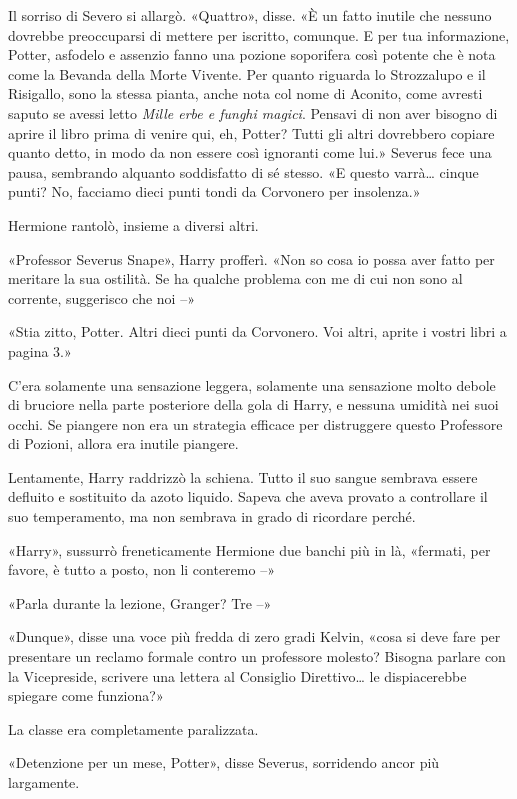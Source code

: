 Il sorriso di Severo si allargò. «Quattro», disse. «È un fatto inutile che nessuno dovrebbe preoccuparsi di mettere per iscritto, comunque. E per tua informazione, Potter, asfodelo e assenzio fanno una pozione soporifera così potente che è nota come la Bevanda della Morte Vivente. Per quanto riguarda lo Strozzalupo e il Risigallo, sono la stessa pianta, anche nota col nome di Aconito, come avresti saputo se avessi letto \textit{Mille erbe e funghi magici}. Pensavi di non aver bisogno di aprire il libro prima di venire qui, eh, Potter? Tutti gli altri dovrebbero copiare quanto detto, in modo da non essere così ignoranti come lui.» Severus fece una pausa, sembrando alquanto soddisfatto di sé stesso. «E questo varrà… cinque punti? No, facciamo dieci punti tondi da Corvonero per insolenza.»

Hermione rantolò, insieme a diversi altri.

«Professor Severus Snape», Harry profferì. «Non so cosa io possa aver fatto per meritare la sua ostilità. Se ha qualche problema con me di cui non sono al corrente, suggerisco che noi –»

«Stia zitto, Potter. Altri dieci punti da Corvonero. Voi altri, aprite i vostri libri a pagina 3.»

C’era solamente una sensazione leggera, solamente una sensazione molto debole di bruciore nella parte posteriore della gola di Harry, e nessuna umidità nei suoi occhi. Se piangere non era un strategia efficace per distruggere questo Professore di Pozioni, allora era inutile piangere.

Lentamente, Harry raddrizzò la schiena. Tutto il suo sangue sembrava essere defluito e sostituito da azoto liquido. Sapeva che aveva provato a controllare il suo temperamento, ma non sembrava in grado di ricordare perché.

«Harry», sussurrò freneticamente Hermione due banchi più in là, «fermati, per favore, è tutto a posto, non li conteremo –»

«Parla durante la lezione, Granger? Tre –»

«Dunque», disse una voce più fredda di zero gradi Kelvin, «cosa si deve fare per presentare un reclamo formale contro un professore molesto? Bisogna parlare con la Vicepreside, scrivere una lettera al Consiglio Direttivo… le dispiacerebbe spiegare come funziona?»

La classe era completamente paralizzata.

«Detenzione per un mese, Potter», disse Severus, sorridendo ancor più largamente.

